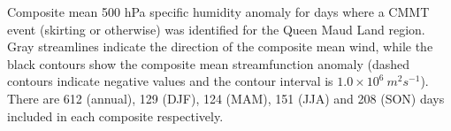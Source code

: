 \label{fig:queen_maud}
Composite mean 500 hPa specific humidity anomaly for days where a CMMT event (skirting or otherwise) was identified for the Queen Maud Land region. Gray streamlines indicate the direction of the composite mean wind, while the black contours show the composite mean streamfunction anomaly (dashed contours indicate negative values and the contour interval is $1.0 \times 10^6 \: m^2 s^{-1}$). There are 612 (annual), 129 (DJF), 124 (MAM), 151 (JJA) and 208 (SON) days included in each composite respectively.